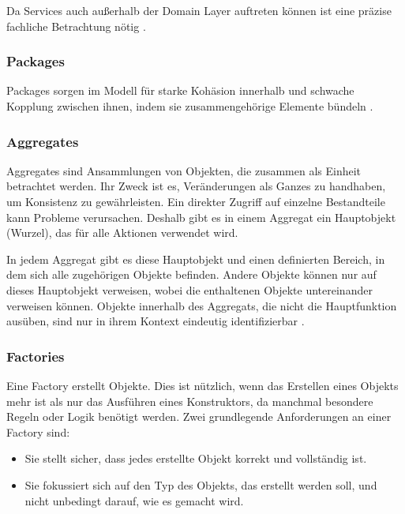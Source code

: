 {Da Services auch außerhalb der Domain Layer auftreten können ist eine präzise fachliche Betrachtung nötig \cite[S. 104 - 108]{evans} \cite[S.74]{daschner}.

\subsubsection{Packages}

\glqq Packages\grqq{} sorgen im Modell für starke Kohäsion innerhalb und schwache Kopplung zwischen ihnen, indem sie zusammengehörige Elemente bündeln \cite[S. 109 - 116]{evans}.

\subsubsection{Aggregates}

\glqq Aggregates\grqq{} sind Ansammlungen von Objekten, die zusammen als Einheit betrachtet werden. Ihr Zweck ist es, Veränderungen als Ganzes zu handhaben, um Konsistenz zu gewährleisten. Ein direkter Zugriff auf einzelne Bestandteile kann Probleme verursachen. Deshalb gibt es in einem Aggregat ein Hauptobjekt (Wurzel), das für alle Aktionen verwendet wird.

In jedem Aggregat gibt es diese Hauptobjekt und einen definierten Bereich, in dem sich alle zugehörigen Objekte befinden. Andere Objekte können nur auf dieses Hauptobjekt verweisen, wobei die enthaltenen Objekte untereinander verweisen können. Objekte innerhalb des Aggregats, die nicht die Hauptfunktion ausüben, sind nur in ihrem Kontext eindeutig identifizierbar \cite[S. 123 - 135]{evans} \cite[S.76]{daschner}.

\subsubsection{Factories}

Eine Factory erstellt Objekte. Dies ist nützlich, wenn das Erstellen eines Objekts mehr ist als nur das Ausführen eines Konstruktors, da manchmal besondere Regeln oder Logik benötigt werden. Zwei grundlegende Anforderungen an einer Factory sind:

\begin{itemize}
\item Sie stellt sicher, dass jedes erstellte Objekt korrekt und vollständig ist.
\item Sie fokussiert sich auf den Typ des Objekts, das erstellt werden soll, und nicht unbedingt darauf, wie es gemacht wird.
\end{itemize}

}
